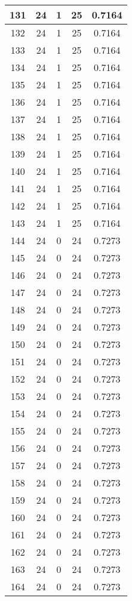 \documentclass[letterpaper, 12pt]{article}
\begin{document}
\begin{longtable}{|c|c|c|c|c|}
\hline
131 & 24 & 1 & 25 & 0.7164 \\
\hline
132 & 24 & 1 & 25 & 0.7164 \\
\hline
133 & 24 & 1 & 25 & 0.7164 \\
\hline
134 & 24 & 1 & 25 & 0.7164 \\
\hline
135 & 24 & 1 & 25 & 0.7164 \\
\hline
136 & 24 & 1 & 25 & 0.7164 \\
\hline
137 & 24 & 1 & 25 & 0.7164 \\
\hline
138 & 24 & 1 & 25 & 0.7164 \\
\hline
139 & 24 & 1 & 25 & 0.7164 \\
\hline
140 & 24 & 1 & 25 & 0.7164 \\
\hline
141 & 24 & 1 & 25 & 0.7164 \\
\hline
142 & 24 & 1 & 25 & 0.7164 \\
\hline
143 & 24 & 1 & 25 & 0.7164 \\
\hline
144 & 24 & 0 & 24 & 0.7273 \\
\hline
145 & 24 & 0 & 24 & 0.7273 \\
\hline
146 & 24 & 0 & 24 & 0.7273 \\
\hline
147 & 24 & 0 & 24 & 0.7273 \\
\hline
148 & 24 & 0 & 24 & 0.7273 \\
\hline
149 & 24 & 0 & 24 & 0.7273 \\
\hline
150 & 24 & 0 & 24 & 0.7273 \\
\hline
151 & 24 & 0 & 24 & 0.7273 \\
\hline
152 & 24 & 0 & 24 & 0.7273 \\
\hline
153 & 24 & 0 & 24 & 0.7273 \\
\hline
154 & 24 & 0 & 24 & 0.7273 \\
\hline
155 & 24 & 0 & 24 & 0.7273 \\
\hline
156 & 24 & 0 & 24 & 0.7273 \\
\hline
157 & 24 & 0 & 24 & 0.7273 \\
\hline
158 & 24 & 0 & 24 & 0.7273 \\
\hline
159 & 24 & 0 & 24 & 0.7273 \\
\hline
160 & 24 & 0 & 24 & 0.7273 \\
\hline
161 & 24 & 0 & 24 & 0.7273 \\
\hline
162 & 24 & 0 & 24 & 0.7273 \\
\hline
163 & 24 & 0 & 24 & 0.7273 \\
\hline
164 & 24 & 0 & 24 & 0.7273 \\

\end{longtable}
\end{document}
